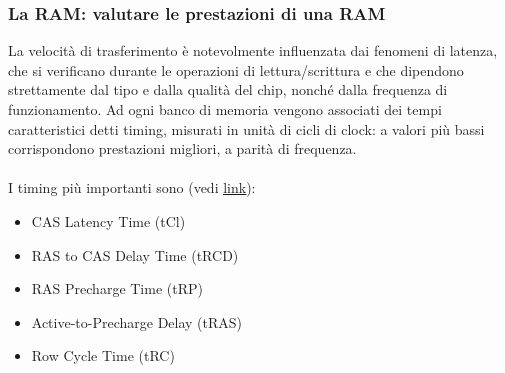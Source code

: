 \begin{frame}
	\frametitle{La RAM: valutare le prestazioni di una RAM}
	
	\begin{block}{}
		La velocità di trasferimento è notevolmente influenzata dai fenomeni di latenza, che si verificano durante le operazioni di lettura/scrittura e che dipendono strettamente dal tipo e dalla qualità del chip, nonché dalla frequenza di funzionamento. Ad ogni banco di memoria vengono associati dei tempi caratteristici detti timing, misurati in unità di cicli di clock: a valori più bassi corrispondono prestazioni migliori, a parità di frequenza.\\~\\
		
		I timing più importanti sono (vedi \underline{\href{https://it.wikipedia.org/wiki/DDR\_SDRAM}{link}}):
		\begin{itemize}
			\item CAS Latency Time (tCl)
			\item RAS to CAS Delay Time (tRCD)
			\item RAS Precharge Time (tRP)
			\item Active-to-Precharge Delay (tRAS)
			\item Row Cycle Time (tRC)
		\end{itemize}
		
	\end{block}

	
	
\end{frame}


